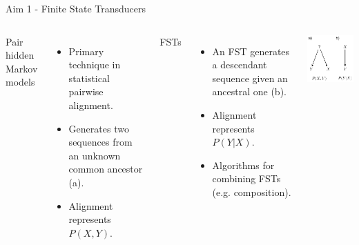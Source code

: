 \documentclass[aspectratio=169]{beamer}
\begin{document}
\begin{frame}{Aim 1 - Finite State Transducers} %
\begin{columns}
Pair hidden Markov models
\begin{itemize}
	\item Primary technique in statistical pairwise alignment.
	\item Generates two sequences from an unknown common ancestor (a).
	\item Alignment represents $P(X,Y)$.
\end{itemize}
\vspace{1em}
FSTs
\begin{itemize}
	\item An FST generates a descendant sequence given an ancestral one (b).
	\item Alignment represents $P(Y | X)$.
	\item Algorithms for combining FSTs (e.g. composition).
\end{itemize}
\includegraphics[scale=0.9,right]{fig-fst.pdf}
\end{columns}
\end{frame} %
\end{document}
